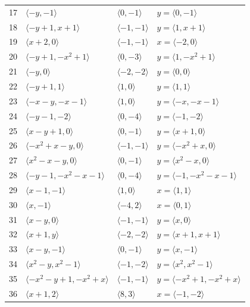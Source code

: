 \documentclass[11pt]{article}
\begin{document}
\begin{longtable}{@{}rlll@{}}
17 & $\langle -y,-1\rangle$ & $\langle 0,-1\rangle$ & $y=\langle 0,-1\rangle$\\
18 & $\langle -y+1,x+1\rangle$ & $\langle -1,-1\rangle$ & $y=\langle 1,x+1\rangle$\\
19 & $\langle x+2,0\rangle$ & $\langle -1,-1\rangle$ & $x=\langle -2,0\rangle$\\
20 & $\langle -y+1,-x^{2}+1\rangle$ & $\langle 0,-3\rangle$ & $y=\langle 1,-x^{2}+1\rangle$\\
21 & $\langle -y,0\rangle$ & $\langle -2,-2\rangle$ & $y=\langle 0,0\rangle$\\
22 & $\langle -y+1,1\rangle$ & $\langle 1,0\rangle$ & $y=\langle 1,1\rangle$\\
23 & $\langle -x-y,-x-1\rangle$ & $\langle 1,0\rangle$ & $y=\langle -x,-x-1\rangle$\\
24 & $\langle -y-1,-2\rangle$ & $\langle 0,-4\rangle$ & $y=\langle -1,-2\rangle$\\
25 & $\langle x-y+1,0\rangle$ & $\langle 0,-1\rangle$ & $y=\langle x+1,0\rangle$\\
26 & $\langle -x^{2}+x-y,0\rangle$ & $\langle -1,-1\rangle$ & $y=\langle -x^{2}+x,0\rangle$\\
27 & $\langle x^{2}-x-y,0\rangle$ & $\langle 0,-1\rangle$ & $y=\langle x^{2}-x,0\rangle$\\
28 & $\langle -y-1,-x^{2}-x-1\rangle$ & $\langle 0,-4\rangle$ & $y=\langle -1,-x^{2}-x-1\rangle$\\
29 & $\langle x-1,-1\rangle$ & $\langle 1,0\rangle$ & $x=\langle 1,1\rangle$\\
30 & $\langle x,-1\rangle$ & $\langle -4,2\rangle$ & $x=\langle 0,1\rangle$\\
31 & $\langle x-y,0\rangle$ & $\langle -1,-1\rangle$ & $y=\langle x,0\rangle$\\
32 & $\langle x+1,y\rangle$ & $\langle -2,-2\rangle$ & $y=\langle x+1,x+1\rangle$\\
33 & $\langle x-y,-1\rangle$ & $\langle 0,-1\rangle$ & $y=\langle x,-1\rangle$\\
34 & $\langle x^{2}-y,x^{2}-1\rangle$ & $\langle -1,-2\rangle$ & $y=\langle x^{2},x^{2}-1\rangle$\\
35 & $\langle -x^{2}-y+1,-x^{2}+x\rangle$ & $\langle -1,-1\rangle$ & $y=\langle -x^{2}+1,-x^{2}+x\rangle$\\
36 & $\langle x+1,2\rangle$ & $\langle 8,3\rangle$ & $x=\langle -1,-2\rangle$\\
\end{longtable}
\endgroup
\end{document}
